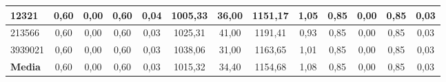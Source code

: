 \documentclass[12pt, spanish]{article}
\begin{document}
\begin{table}[H]
\begin{adjustwidth}{-1cm}{-1cm}
\begin{tabular}{|l|c|c|c|c|c|c|c|c|c|c|c|c|}
12321                                                   & 0,60                         & 0,00                           & 0,60                      & 0,04                   & 1005,33                      & 36,00                          & 1151,17                   & 1,05                   & 0,85                         & 0,00                           & 0,85                      & 0,03                   \\ \hline
213566                                                  & 0,60                         & 0,00                           & 0,60                      & 0,03                   & 1025,31                      & 41,00                          & 1191,41                   & 0,93                   & 0,85                         & 0,00                           & 0,85                      & 0,03                   \\ \hline
3939021                                                 & 0,60                         & 0,00                           & 0,60                      & 0,03                   & 1038,06                      & 31,00                          & 1163,65                   & 1,01                   & 0,85                         & 0,00                           & 0,85                      & 0,03                   \\ \hline
\textbf{Media}                                          & 0,60                         & 0,00                           & 0,60                      & 0,03                   & 1015,32                      & 34,40                          & 1154,68                   & 1,08                   & 0,85                         & 0,00                           & 0,85                      & 0,03                   \\ \hline
\end{tabular}

\end{adjustwidth}

\end{table}	
\end{document}
